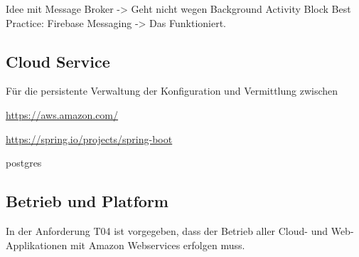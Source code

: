 Idee mit Message Broker -> Geht nicht wegen Background Activity Block
Best Practice: Firebase Messaging -> Das Funktioniert.

\subsection{Cloud Service}\label{subsec:cloud-service2}

Für die persistente Verwaltung der Konfiguration und Vermittlung zwischen

\url{https://aws.amazon.com/}

    \url{https://spring.io/projects/spring-boot}

    postgres

\subsection{Betrieb und Platform}\label{subsec:betrieb-und-platform}

In der Anforderung T04 ist vorgegeben, dass der Betrieb aller Cloud- und Web-Applikationen mit Amazon Webservices erfolgen muss.
